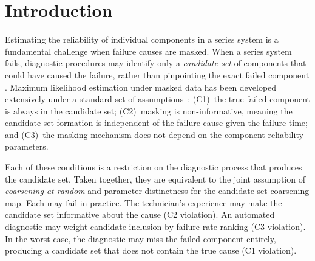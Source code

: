 \section{Introduction}
\label{sec:introduction}

Estimating the reliability of individual components in a series system is a
fundamental challenge when failure causes are masked. When a series system
fails, diagnostic procedures may identify only a \emph{candidate set} of
components that could have caused the failure, rather than pinpointing the
exact failed component \citep{Usher-1988}. Maximum likelihood estimation under
masked data has been developed extensively under a standard set of
assumptions~\citep{Lin-1993, towell2023reliability, towell2026masked}: (C1)~the true failed
component is always in the candidate set; (C2)~masking is non-informative,
meaning the candidate set formation is independent of the failure cause given
the failure time; and (C3)~the masking mechanism does not depend on the
component reliability parameters.

Each of these conditions is a restriction on the diagnostic process that
produces the candidate set. Taken together, they are equivalent to the joint
assumption of \emph{coarsening at random}
\citep{HeitjanRubin1991, JacobsenKeiding1995} and parameter distinctness
\citep{Rubin1976} for the candidate-set coarsening map. Each may fail in
practice. The technician's experience may make the candidate set informative
about the cause (C2 violation). An automated diagnostic may weight candidate
inclusion by failure-rate ranking (C3 violation). In the worst case, the
diagnostic may miss the failed component entirely, producing a candidate set
that does not contain the true cause (C1 violation).

